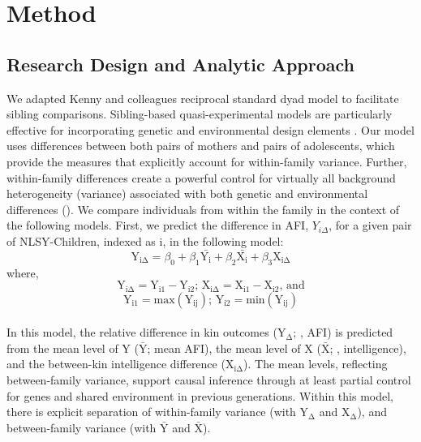 \documentclass[a4paper,man,apacite,natbib,12pt,longtable]{apa6}\usepackage[]{graphicx}\usepackage[]{color}
\begin{document}
\section{Method}
\subsection{Research Design and Analytic Approach}
We adapted Kenny and colleagues \citeyearpar{kenny2001social,kenny2006dyadic} reciprocal standard dyad model to facilitate sibling comparisons. Sibling-based quasi-experimental models are particularly effective for incorporating genetic and environmental design elements \citep{Lahey2010,Rutter2007}. Our model uses differences between both pairs of mothers and pairs of adolescents, which provide the measures that explicitly account for within-family variance. Further, within-family differences create a powerful control for virtually all background heterogeneity (variance) associated with both genetic and environmental differences (\citeauthor{Lahey2010}). We compare individuals from within the family in the context of the following models. First, we predict the difference in AFI, $Y_{i\Delta}$, for a given pair of NLSY-Children, indexed as i, in the following model:
\begin{equation}\label{equation_discord_main}
\mathrm{Y_{i\Delta}} = \beta_0 + \beta_1\mathrm{\bar{Y_{i}}} + \beta_2\mathrm{\bar{X_{i}}} + \beta_3\mathrm{X_{i\Delta}}
\end{equation}\vspace{-10pt}
where,
\begin{equation}\label{equation_discord_defs_delta}
\mathrm{Y_{i\Delta}} = \mathrm{Y_{i1}} - \mathrm{Y_{i2}};\, \mathrm{X_{i\Delta}} = \mathrm{X_{i1}} - \mathrm{X_{i2}},\, \mathrm{and}
\end{equation}
\begin{equation}\label{equation_discord_defs_min}
\mathrm{Y_{i1}} = \mathrm{max}(\mathrm{Y_{ij}});\, \mathrm{Y_{i2}} = \mathrm{min}(\mathrm{Y_{ij}})
\end{equation}\\

In this model, the relative difference in kin outcomes ($\mathrm{Y_{\Delta}}$; \eg, AFI) is predicted from the mean level of Y ($\mathrm{\bar{Y}}$; \eg mean AFI), the mean level of X ($\mathrm{\bar{X}}$; \eg, intelligence), and the between-kin intelligence difference ($\mathrm{X_{i\Delta}}$). The mean levels, reflecting between-family variance, support causal inference through at least partial control for genes and shared environment in previous generations. Within this model, there is explicit separation of within-family variance (with $\mathrm{Y_{\Delta}}$ and $\mathrm{X_{\Delta}}$), and between-family variance (with $\mathrm{\bar{Y}}$ and $\mathrm{\bar{X}}$).
\end{document}
